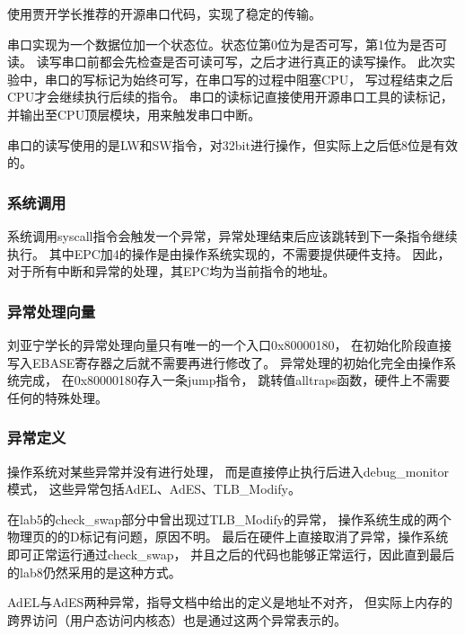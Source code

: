             使用贾开学长推荐的开源串口代码，实现了稳定的传输。

            串口实现为一个数据位加一个状态位。状态位第0位为是否可写，第1位为是否可读。
            读写串口前都会先检查是否可读可写，之后才进行真正的读写操作。
            此次实验中，串口的写标记为始终可写，在串口写的过程中阻塞CPU，
            写过程结束之后CPU才会继续执行后续的指令。
            串口的读标记直接使用开源串口工具的读标记，并输出至CPU顶层模块，用来触发串口中断。

            串口的读写使用的是LW和SW指令，对32bit进行操作，但实际上之后低8位是有效的。

        \subsubsection{系统调用}
            系统调用syscall指令会触发一个异常，异常处理结束后应该跳转到下一条指令继续执行。
            其中EPC加4的操作是由操作系统实现的，不需要提供硬件支持。
            因此，对于所有中断和异常的处理，其EPC均为当前指令的地址。

        \subsubsection{异常处理向量}
            刘亚宁学长的异常处理向量只有唯一的一个入口0x80000180，
            在初始化阶段直接写入EBASE寄存器之后就不需要再进行修改了。
            异常处理的初始化完全由操作系统完成，
            在0x80000180存入一条jump指令，
            跳转值alltraps函数，硬件上不需要任何的特殊处理。

        \subsubsection{异常定义}
            操作系统对某些异常并没有进行处理，
            而是直接停止执行后进入debug\_monitor模式，
            这些异常包括AdEL、AdES、TLB\_Modify。

            在lab5的check\_swap部分中曾出现过TLB\_Modify的异常，
            操作系统生成的两个物理页的的D标记有问题，原因不明。
            最后在硬件上直接取消了异常，操作系统即可正常运行通过check\_swap，
            并且之后的代码也能够正常运行，因此直到最后的lab8仍然采用的是这种方式。

            AdEL与AdES两种异常，指导文档中给出的定义是地址不对齐，
            但实际上内存的跨界访问（用户态访问内核态）也是通过这两个异常表示的。

